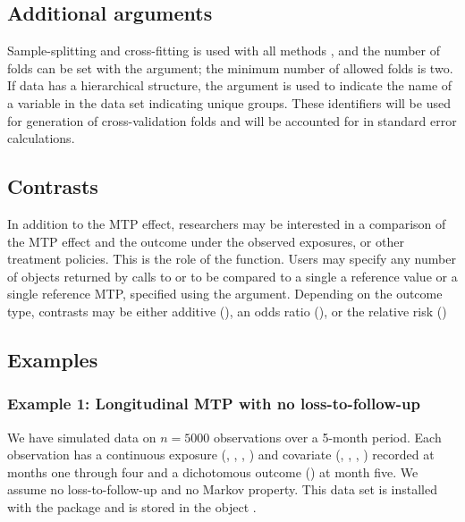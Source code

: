 \documentclass[]{jss}
\begin{document}
\hypertarget{additional-arguments}{%
\subsection{Additional arguments}\label{additional-arguments}}

Sample-splitting and cross-fitting is used with all methods \citep{zhengCrossValidatedTargetedMinimumLossBased2011b, chernozhukovDoubleDebiasedMachine2018}, and the number
of folds can be set with the  argument; the minimum number of allowed folds is two.
If data has a hierarchical structure, the  argument is used to indicate the name of a variable
in the data set indicating unique groups. These identifiers will be used for generation of cross-validation 
folds and will be accounted for in standard error calculations.

\hypertarget{contrasts}{%
\subsection{Contrasts}\label{contrasts}}

In addition to the MTP effect, researchers may be interested in a comparison of the MTP effect
and the outcome under the observed exposures, or other treatment policies. This is the role of the 
function. Users may specify any number of objects returned by calls to  or  to 
be compared to a single a reference value or a single reference MTP, specified using the  argument. 
Depending on the outcome type, contrasts may be either additive (), an odds ratio (), 
or the relative risk ()

\hypertarget{examples}{%
\subsection{Examples}\label{examples}}

\hypertarget{example-1-longitudinal-mtp-with-no-loss-to-follow-up}{%
\subsubsection{Example 1: Longitudinal MTP with no
loss-to-follow-up}\label{example-1-longitudinal-mtp-with-no-loss-to-follow-up}}

We have simulated data on \(n = 5000\) observations over a 5-month
period. Each observation has a continuous exposure (,
, , ) and covariate (,
, , ) recorded at months one through four
and a dichotomous outcome () at month five. We assume no
loss-to-follow-up and no Markov property. This data set is installed
with the package and is stored in the object .
\end{document}

